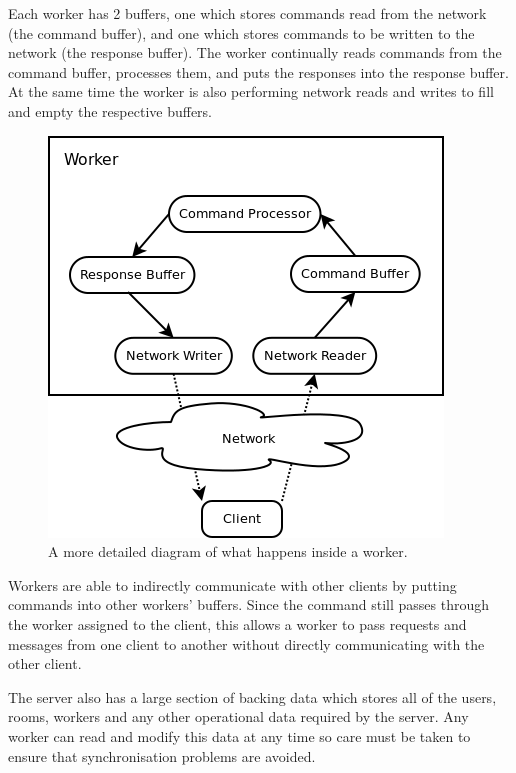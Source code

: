 Each worker has 2 buffers, one which stores commands read from the network (the command buffer), and one which stores commands to be written to the network (the response buffer). The worker continually reads commands from the command buffer, processes them, and puts the responses into the response buffer. At the same time the worker is also performing network reads and writes to fill and empty the respective buffers.

\begin{figure}[!h]
    \begin{center}
        \includegraphics[scale=0.75]{chapter2/diagrams/worker_detail.png}
        \caption{A more detailed diagram of what happens inside a worker.}
        \label{WorkerDatailedDia}
    \end{center}
\end{figure}

Workers are able to indirectly communicate with other clients by putting commands into other workers' buffers. Since the command still passes through the worker assigned to the client, this allows a worker to pass requests and messages from one client to another without directly communicating with the other client. 

The server also has a large section of backing data which stores all of the users, rooms, workers and any other operational data required by the server. Any worker can read and modify this data at any time so care must be taken to ensure that synchronisation problems are avoided.

